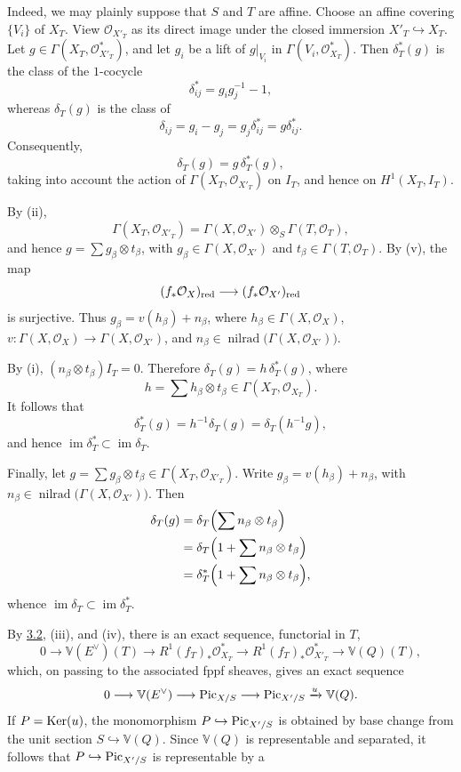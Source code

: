 Indeed, we may plainly suppose that $S$ and $T$ are affine. Choose an affine
covering $\{V_i\}$ of $X_T$. View $\mathcal O_{X'_T}$ as its direct image
under the closed immersion $X'_T\hookrightarrow X_T$. Let
$g\in\Gamma(X_T,\mathcal O_{X'_T}^{*})$, and let $g_i$ be a lift of
$g|_{V_i}$ in $\Gamma(V_i,\mathcal O_{X_T}^{*})$. Then $\delta_T^*(g)$ is
the class of the $1$-cocycle
\[
  \delta_{ij}^*=g_i g_j^{-1}-1,
\]
whereas $\delta_T(g)$ is the class of
\[
  \delta_{ij}=g_i-g_j=g_j\delta_{ij}^*=g\delta_{ij}^*.
\]
Consequently,
\[
  \delta_T(g)=g\,\delta_T^*(g),
\]
taking into account the action of
$\Gamma(X_T,\mathcal O_{X'_T})$ on $I_T$, and hence on $H^1(X_T,I_T)$.

By (ii),
\[
  \Gamma(X_T,\mathcal O_{X'_T})
  =\Gamma(X,\mathcal O_{X'})\otimes_S\Gamma(T,\mathcal O_T),
\]
and hence $g=\sum g_\beta\otimes t_\beta$, with
$g_\beta\in\Gamma(X,\mathcal O_{X'})$ and
$t_\beta\in\Gamma(T,\mathcal O_T)$. By (v), the map
\[
  (f_*\mathcal O_X)_{\mathrm{red}}\longrightarrow
  (f_*\mathcal O_{X'})_{\mathrm{red}}
\]
is surjective. Thus
$g_\beta=v(h_\beta)+n_\beta$, where
$h_\beta\in\Gamma(X,\mathcal O_X)$,
$v:\Gamma(X,\mathcal O_X)\to\Gamma(X,\mathcal O_{X'})$, and
$n_\beta\in\operatorname{nilrad}\bigl(\Gamma(X,\mathcal O_{X'})\bigr)$.

By (i), $(n_\beta\otimes t_\beta)I_T=0$. Therefore
$\delta_T(g)=h\,\delta_T^*(g)$, where
\[
  h=\sum h_\beta\otimes t_\beta
  \in\Gamma(X_T,\mathcal O_{X_T}).
\]
It follows that
\[
  \delta_T^*(g)=h^{-1}\delta_T(g)=\delta_T(h^{-1}g),
\]
and hence $\operatorname{im}\delta_T^*\subset
\operatorname{im}\delta_T$.

Finally, let
$g=\sum g_\beta\otimes t_\beta\in\Gamma(X_T,\mathcal O_{X'_T})$.
Write $g_\beta=v(h_\beta)+n_\beta$, with
$n_\beta\in\operatorname{nilrad}\bigl(\Gamma(X,\mathcal O_{X'})\bigr)$. Then
\[
\begin{split}
  \delta_T(g)
  &=\delta_T\Bigl(\sum n_\beta\otimes t_\beta\Bigr)\\
  &=\delta_T\Bigl(1+\sum n_\beta\otimes t_\beta\Bigr)\\
  &=\delta_T^*\Bigl(1+\sum n_\beta\otimes t_\beta\Bigr),
\end{split}
\]
whence $\operatorname{im}\delta_T\subset
\operatorname{im}\delta_T^*$.

By \hyperlink{sga6.e12.para.3-2}{3.2}, (iii), and (iv), there is an exact sequence, functorial in $T$,
\[
  0\longrightarrow\mathbb V(E^\vee)(T)
  \longrightarrow R^1(f_T)_*\mathcal O_{X_T}^{*}
  \longrightarrow R^1(f_T)_*\mathcal O_{X'_T}^{*}
  \longrightarrow\mathbb V(Q)(T),
\]
which, on passing to the associated fppf sheaves, gives an exact sequence
\[
  0\longrightarrow\mathbb V(E^\vee)\longrightarrow\operatorname{Pic}_{X/S}
  \longrightarrow\operatorname{Pic}_{X'/S}\xrightarrow{u}\mathbb V(Q).
\]
If $P=\operatorname{Ker}(u)$, the monomorphism $P\hookrightarrow\operatorname{Pic}_{X'/S}$ is obtained
by base change from the unit section $S\hookrightarrow\mathbb V(Q)$.
Since $\mathbb V(Q)$ is representable and separated, it follows that
$P\hookrightarrow\operatorname{Pic}_{X'/S}$ is representable by a

